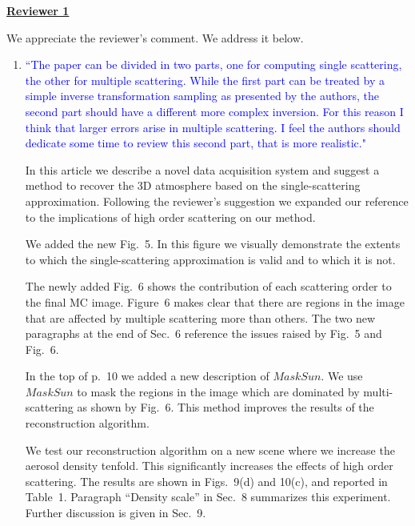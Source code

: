 \documentclass[12pt]{article}
\begin{document}
\noindent \underline {\bf Reviewer 1}

We appreciate the reviewer's comment. We address it below.

\begin{enumerate}

\item \textcolor{blue}{ ``The paper can be divided in two parts, one
    for computing single scattering, the other for multiple
    scattering. While the first part can be treated by a simple
    inverse transformation sampling as presented by the authors, the
    second part should have a different more complex inversion. For
    this reason I think that larger errors arise in multiple
    scattering. I feel the authors should dedicate some time to review
    this second part, that is more realistic."}

  {
    In this article we describe a novel data acquisition system
    and suggest a method to recover the 3D atmosphere based on
    the single-scattering approximation. Following the reviewer's
    suggestion we expanded our reference to the implications
    of high order scattering on our method.

    We added the new Fig.~5. In this figure we visually demonstrate
    the extents to which the single-scattering approximation is valid
    and to which it is not.

    The newly added Fig.~6 shows the contribution of each scattering order to
    the final MC image. Figure~6 makes clear that there are regions in
    the image that are affected by multiple scattering more than others.
    The two new paragraphs at the end of Sec.~6 reference the issues
    raised by Fig.~5 and Fig.~6.

    In the top of p.~10 we added a new description of $MaskSun$. We use
    $MaskSun$ to mask the regions in the image which are dominated 
    by multi-scattering as shown by Fig.~6. This method improves the
    results of the reconstruction algorithm.

    We test our reconstruction algorithm on a new scene where we
    increase the aerosol density tenfold. This significantly increases the
    effects of high order scattering. The results are shown in 
    Figs.~9(d) and 10(c), and reported in Table~1.
    Paragraph ``Density scale'' in Sec.~8 summarizes this experiment.
    Further discussion is given in Sec.~9.
  }

\end{enumerate}
\end{document}
